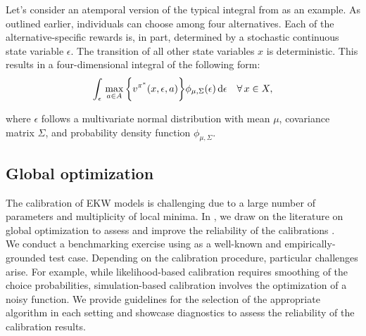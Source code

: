 \noindent Let's consider an atemporal version of the typical integral from \citet{Keane.1994} as an example. As outlined earlier, individuals can choose among four alternatives. Each of the alternative-specific rewards is, in part, determined by a stochastic continuous state variable $\epsilon$. The transition of all other state variables $x$ is deterministic. This results in a four-dimensional integral of the following form:
%
\begin{align*}
   \int_{\epsilon}\, \max_{a\in A} \bigg\{v^{\pi^*}(x, \epsilon, a)\bigg\} \phi_{\mu, \Sigma}(\epsilon) \mathop{}\!\mathrm{d}\epsilon \quad\forall\, x \in X,
\end{align*}

\noindent where $\epsilon$ follows a multivariate normal distribution with mean $\mu$, covariance matrix $ \Sigma$, and probability density function $\phi_{\mu, \Sigma}$.
\subsection{Global optimization}
The calibration of EKW models is challenging due to a large number of parameters and multiplicity of local minima. In \citet{Eisenhauer.2020b}, we draw on the literature on global optimization to assess and improve the reliability of the calibrations \citep{Locatelli.2013, Nocedal.2006}.\\

\noindent We conduct a benchmarking exercise using \citet{Keane.1994, Keane.1997} as a well-known and empirically-grounded test case. Depending on the calibration procedure, particular challenges arise. For example, while likelihood-based calibration requires smoothing of the choice probabilities, simulation-based calibration involves the optimization of a noisy function. We provide guidelines for the selection of the appropriate algorithm in each setting and showcase diagnostics to assess the reliability of the calibration results.
